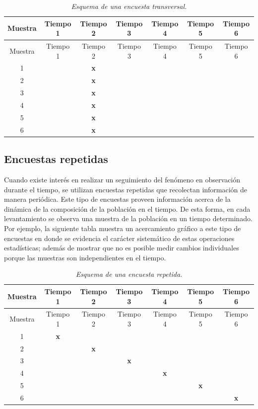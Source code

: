 \documentclass[
  10pt,
  spanish,
]{book}
\begin{document}
\begin{longtable}[]{@{}ccccccc@{}}
\caption{\emph{Esquema de una encuesta transversal.}}\tabularnewline
\toprule
Muestra & Tiempo 1 & Tiempo 2 & Tiempo 3 & Tiempo 4 & Tiempo 5 & Tiempo 6 \\
\midrule
\endfirsthead
\toprule
Muestra & Tiempo 1 & Tiempo 2 & Tiempo 3 & Tiempo 4 & Tiempo 5 & Tiempo 6 \\
\midrule
\endhead
1 & & \textbf{x} & & & & \\
2 & & \textbf{x} & & & & \\
3 & & \textbf{x} & & & & \\
4 & & \textbf{x} & & & & \\
5 & & \textbf{x} & & & & \\
6 & & \textbf{x} & & & & \\
\bottomrule
\end{longtable}

\hypertarget{encuestas-repetidas}{%
\subsection{Encuestas repetidas}\label{encuestas-repetidas}}

Cuando existe interés en realizar un seguimiento del fenómeno en observación durante el tiempo, se utilizan encuestas repetidas que recolectan información de manera periódica. Este tipo de encuestas proveen información acerca de la dinámica de la composición de la población en el tiempo. De esta forma, en cada levantamiento se observa una muestra de la población en un tiempo determinado. Por ejemplo, la siguiente tabla muestra un acercamiento gráfico a este tipo de encuestas en donde se evidencia el carácter sistemático de estas operaciones estadísticas; además de mostrar que no es posible medir cambios individuales porque las muestras son independientes en el tiempo.

\begin{longtable}[]{@{}ccccccc@{}}
\caption{\emph{Esquema de una encuesta repetida.}}\tabularnewline
\toprule
Muestra & Tiempo 1 & Tiempo 2 & Tiempo 3 & Tiempo 4 & Tiempo 5 & Tiempo 6 \\
\midrule
\endfirsthead
\toprule
Muestra & Tiempo 1 & Tiempo 2 & Tiempo 3 & Tiempo 4 & Tiempo 5 & Tiempo 6 \\
\midrule
\endhead
1 & \textbf{x} & & & & & \\
2 & & \textbf{x} & & & & \\
3 & & & \textbf{x} & & & \\
4 & & & & \textbf{x} & & \\
5 & & & & & \textbf{x} & \\
6 & & & & & & \textbf{x} \\
\bottomrule
\end{longtable}
\end{document}
